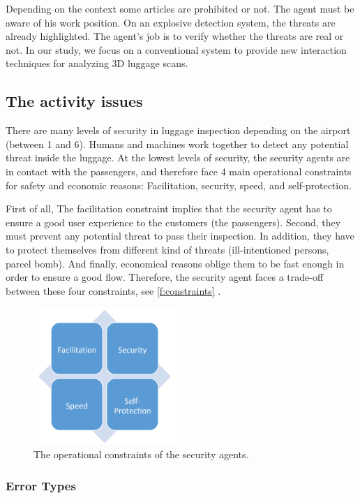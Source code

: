 Depending on the context some articles are prohibited or not. The agent must be aware of his work position.
On an explosive detection system, the threats are already highlighted. The agent's job is to verify whether the threats are real or not.
In our study, we focus on a conventional system to provide new interaction techniques for analyzing 3D luggage scans.

\subsection{The activity issues}
There are many levels of security in luggage inspection depending on the airport (between 1 and 6). Humans and machines work together to detect any potential threat inside the luggage. At the lowest levels of security, the security agents are in contact with the passengers, and therefore face 4 main operational constraints for safety and economic reasons: Facilitation, security, speed, and self-protection. 

First of all, The facilitation constraint implies that the security agent has to ensure a good user experience to the customers (the passengers). Second, they must prevent any potential threat to pass their inspection. In addition, they have to protect themselves from different kind of threats (ill-intentioned persons, parcel bomb). And finally, economical reasons oblige them to be fast enough in order to ensure a good flow. Therefore, the security agent faces a trade-off between these four constraints, see  \autoref{f:constraints} .
\begin{figure}
\centering
	\includegraphics[height=5.2cm]{Figures/constraints}
	\caption{The operational constraints of the security agents.}
	\label{f:constraints}
\end{figure}



\subsubsection{ Error Types }



